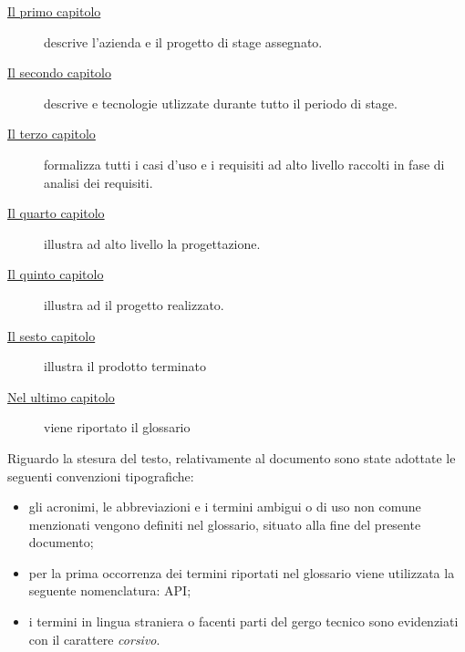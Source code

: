 \begin{description}
	\item[{\hyperref[cap:introduzione]{Il primo capitolo}}] descrive l’azienda e il progetto di stage assegnato.
	
	\item[{\hyperref[cap:Tecnologie utilizzate]{Il secondo capitolo}}] descrive e tecnologie utlizzate durante
	tutto il periodo di stage.
	
	\item[{\hyperref[cap:analisi-requisiti]{Il terzo capitolo}}] formalizza tutti i casi d’uso e i requisiti ad alto livello raccolti in fase di
	analisi dei requisiti.
	
	\item[{\hyperref[cap:progettazione]{Il quarto capitolo}}] illustra ad alto livello la progettazione.
	
		\item[{\hyperref[cap:progetto-terminato]{Il quinto capitolo}}] illustra ad il progetto realizzato.
	
	\item[{\hyperref[cap:conclusioni]{Il sesto capitolo}}] illustra il prodotto terminato
	
	\item[{\hyperref[cap:conclusioni]{Nel ultimo capitolo}}] viene riportato il glossario
\end{description}
Riguardo la stesura del testo, relativamente al documento sono state adottate le seguenti convenzioni tipografiche:
\begin{itemize}
	\item gli acronimi, le abbreviazioni e i termini ambigui o di uso non comune menzionati vengono definiti nel glossario, situato alla fine del presente documento;
	\item per la prima occorrenza dei termini riportati nel glossario viene utilizzata la seguente nomenclatura: \gls{API};
	\item i termini in lingua straniera o facenti parti del gergo tecnico sono evidenziati con il carattere \emph{corsivo}.
\end{itemize}
\endgroup			
\vfill

